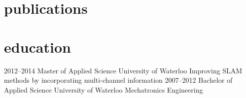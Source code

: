 \documentclass[stdletter]{friggeri-cv} %
\begin{document}


\vspace{-3mm}
\section{publications}

\vspace{-3mm}

\vspace{-2mm}
\vspace{-3mm}


\vspace{-2mm}
\section{education}

\begin{entrylist}
\entry
{2012--2014}
{Master {\normalfont of Applied Science}}
{University of Waterloo}
{Improving SLAM methods by incorporating multi-channel information}
\entry
{2007--2012}
{Bachelor {\normalfont of Applied Science}}
{University of Waterloo}
{Mechatronics Engineering}
\end{entrylist}
\end{document}
